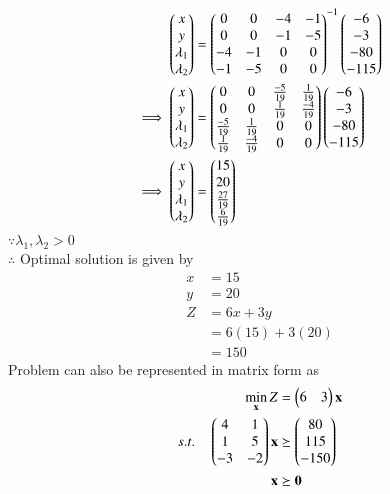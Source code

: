 \documentclass[journal,12pt,twocolumn]{IEEEtran}
\begin{document}
\begin{align}
    \begin{pmatrix}x \\ y \\ \lambda_1 \\ \lambda_2\end{pmatrix} &= \begin{pmatrix}0 & 0 & -4 & -1 \\ 0 & 0 & -1 & -5 \\ -4 & -1 & 0 & 0 \\ -1 & -5 & 0 & 0\end{pmatrix}^{-1}\begin{pmatrix}-6 \\ -3 \\ -80 \\ -115\end{pmatrix}
    \\
    \implies   \begin{pmatrix}x \\ y \\ \lambda_1 \\ \lambda_2\end{pmatrix} &= \begin{pmatrix}0 & 0 & \frac{-5}{19} & \frac{1}{19} \\ 0 & 0 & \frac{1}{19} & \frac{-4}{19} \\ \frac{-5}{19} & \frac{1}{19} & 0 & 0 \\ \frac{1}{19} & \frac{-4}{19} & 0 & 0\end{pmatrix}\begin{pmatrix}-6 \\ -3 \\ -80 \\ -115\end{pmatrix}
    \\
    \implies \begin{pmatrix}x \\ y \\ \lambda_1 \\ \lambda_2 \end{pmatrix} &= \begin{pmatrix}15 \\ 20 \\ \frac{27}{19} \\ \frac{6}{19} \end{pmatrix}
\end{align}
$\because \lambda_1,\lambda_2 > 0 $
\\
$\therefore$ Optimal solution is given by
\begin{align}
    x &= 15 \\
    y &= 20 \\
    Z &= 6x+3y \\
    &= 6(15) + 3(20) \\
    &= 150
\end{align}
Problem can also be represented in matrix form as
\begin{align}
        \min_{\mathbf{x}} Z &= \begin{pmatrix}6 & 3\end{pmatrix}\mathbf{x}\\
        s.t. \quad 
        \begin{pmatrix}4 & 1 \\ 1 & 5 \\ -3 & -2 \end{pmatrix}\mathbf{x} &\succeq \begin{pmatrix}80\\115\\-150\end{pmatrix} \\
        \mathbf{x} &\succeq \mathbf{0}
    \end{align}
    
\end{document}

